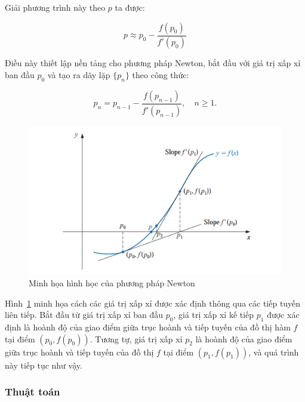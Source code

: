 Giải phương trình này theo $p$ ta được:

$$p \approx p_0 - \frac{f(p_0)}{f'(p_0)}$$

Điều này thiết lập nền tảng cho phương pháp Newton, bắt đầu với giá trị xấp xỉ ban đầu $p_0$ và tạo ra dãy lặp $\{p_n\}$ theo công thức:

$$p_n = p_{n-1} - \frac{f(p_{n-1})}{f'(p_{n-1})},\quad n \geq 1.$$

\begin{figure}[H]
    \centering
    \includegraphics[width=1\linewidth]{figures/newton method.png}
    \caption{Minh họa hình học của phương pháp Newton}
    \label{fig:placeholder}
\end{figure}

Hình~\ref{fig:placeholder} minh họa cách các giá trị xấp xỉ được xác định thông qua các tiếp tuyến liên tiếp. 
Bắt đầu từ giá trị xấp xỉ ban đầu $p_0$, giá trị xấp xỉ kế tiếp $p_1$ được xác định là hoành độ của giao điểm giữa trục hoành và tiếp tuyến của đồ thị hàm $f$ tại điểm $(p_0, f(p_0))$. Tương tự, giá trị xấp xỉ $p_2$ là hoành độ của giao điểm giữa trục hoành và tiếp tuyến của đồ thị $f$ tại điểm $(p_1, f(p_1))$, và quá trình này tiếp tục như vậy. 

\subsubsection*{Thuật toán}

